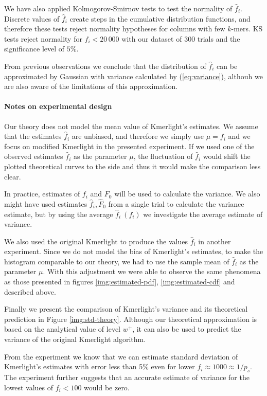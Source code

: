 \medskip

We have also applied Kolmogorov-Smirnov tests to test the normality of $\hat f_i$. Discrete
values of $\hat f_i$ create steps in the cumulative distribution functions, and therefore these
tests reject normality hypotheses for columns with few $k$-mers. KS tests reject normality
for $f_i < 20\,000$ with our dataset of 300 trials and the significance level of $5\%$. 

From previous observations we conclude that the distribution of $\hat f_i$ can be approximated
by Gaussian with variance calculated by (\ref{eq:variance}), althouh we are also aware of the
limitations of this approximation.

\paragraph{Notes on experimental design}
Our theory does not model the mean value of Kmerlight's estimates. We assume that the estimates
$\hat f_i$ are unbiased, and therefore we simply use $\mu = f_i$ and we focus on modified
Kmerlight in the presented experiment. If we used one of the observed estimates $\hat f_i$
as the parameter $\mu$, the fluctuation of $\hat f_i$ would shift the plotted theoretical 
curves to the side and thus it would make the comparison less clear. 

In practice, estimates of $f_i$ and $F_0$ will be used to calculate the variance. We also might
have used estimates $\hat f_i, \hat F_0$ from a single trial to calculate the variance estimate, 
but by using the average $\hat f_i~(f_i)$ we investigate the average estimate of variance.   

We also used the original Kmerlight to produce the values $\hat f_i$ in another experiment.
Since we do not model the bias of Kmerlight's estimates, to make the histogram comparable
to our theory, we had to use the sample mean of $\hat f_i$ as the parameter $\mu$.
With this adjustment we were able to observe the same phenomena as those presented in figures
\ref{img:estimated-pdf}, \ref{img:estimated-cdf} and described above.

\medskip

Finally we present the comparison of Kmerlight's variance and its theoretical prediction in
Figure \ref{img:std-theory}. Although our theoretical approximation is based on the 
analytical value of level $w^+$, it can also be used to predict the variance of the original 
Kmerlight algorithm. 

From the experiment we know that we can estimate standard deviation of Kmerlight's estimates
with error less than 5\% even for lower $f_i \approx 1000 \approx 1/p_s.$
The experiment further suggests that an accurate estimate of
variance for the lowest values of $f_i < 100$ would be zero. 

